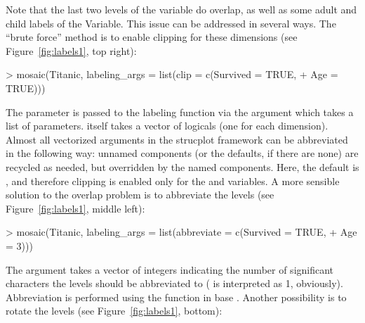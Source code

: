 \documentclass{Z}
\newcommand{\codefun}[1]{\code{#1()}}
\begin{document}
\noindent Note that the last two levels of the  variable do
overlap, as well as some adult and child labels of the  Variable.
This issue can be addressed in several ways. The ``brute force''
method is to enable clipping for these dimensions (see
Figure~\ref{fig:labels1}, top right):

\begin{Schunk}
\begin{Sinput}
> mosaic(Titanic, labeling_args = list(clip = c(Survived = TRUE, 
+     Age = TRUE)))
\end{Sinput}
\end{Schunk}


\noindent The  parameter is passed to the labeling function
via the  argument which takes a list of
parameters.  itself takes a vector of logicals (one for
each dimension). 
Almost all vectorized arguments in the strucplot
framework can be abbreviated in the following way: unnamed components
(or the defaults, if there are none) are recycled as needed, but
overridden by the named components. Here, the default is ,
and therefore clipping is enabled only for the  and  variables.
A more sensible solution to the overlap problem is to abbreviate the 
levels (see Figure~\ref{fig:labels1}, middle left):

\begin{Schunk}
\begin{Sinput}
> mosaic(Titanic, labeling_args = list(abbreviate = c(Survived = TRUE, 
+     Age = 3)))
\end{Sinput}
\end{Schunk}


\noindent The  argument takes a vector of
integers indicating the number of significant characters the levels should be
abbreviated to ( is interpreted as 1, obviously). Abbreviation
is performed using the \codefun{abbreviate} function in base . Another
possibility is to rotate the levels (see Figure~\ref{fig:labels1}, bottom):
\end{document}
